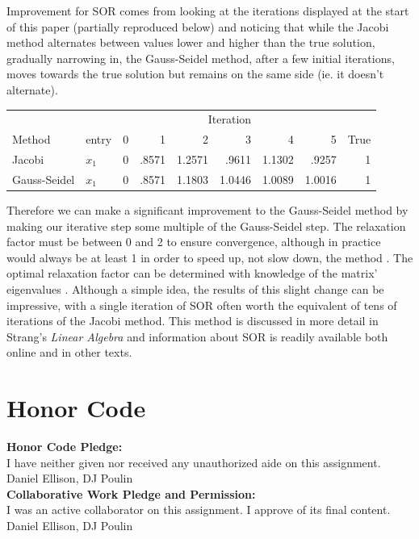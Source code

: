 \documentclass[12pt,letterpaper]{article}
\theoremstyle{definition}
\begin{document}
Improvement for SOR comes from looking at the iterations displayed at the start of this paper (partially reproduced below) and noticing that  while the Jacobi method alternates between values lower and higher than the true solution, gradually narrowing in, the Gauss-Seidel method, after a few initial iterations, moves towards the true solution but remains on the same side (ie. it doesn't alternate).

\begin{center}
\begin{tabular}{llrrrrrrr}
\toprule
&&\multicolumn{6}{c}{Iteration}&\\\cline{3-8}
Method & entry & 0&1&2&3&4&5&True\\
\midrule
Jacobi & $x_1$ & 0 & .8571 & 1.2571 & .9611 & 1.1302 & .9257 & 1\\
Gauss-Seidel & $x_1$ & 0 & .8571 & 1.1803 & 1.0446 & 1.0089 & 1.0016 &1\\
\bottomrule
\end{tabular}
\end{center}

 Therefore we can make a significant improvement to the Gauss-Seidel method by making our iterative step some multiple of the Gauss-Seidel step. The relaxation factor must be between 0 and 2 to ensure convergence, although in practice would always be at least 1 in order to speed up, not slow down, the method \cite{Strang06}. The optimal relaxation factor can be determined with knowledge of the matrix' eigenvalues \cite{Strang06}. Although a simple idea, the results of this slight change can be impressive, with a single iteration of SOR often worth the equivalent of tens of iterations of the Jacobi method. This method is discussed in more detail in Strang's \textit{Linear Algebra} \cite{Strang06} and information about SOR is readily available both online and in other texts.




\section*{Honor Code}
\begin{framed}
	\noindent \textbf{Honor Code Pledge:}\\  I have neither given nor received any unauthorized aide on this assignment. Daniel Ellison, DJ Poulin\\
	\noindent \textbf{Collaborative Work Pledge and Permission:}\\ I was an active collaborator on this assignment.  I approve of its final content. Daniel Ellison, DJ Poulin
	\vspace{1.5in}
\end{framed}
\nocite{*}

 
\end{document}
